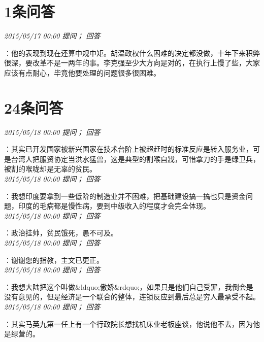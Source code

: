\documentclass[twocolumn]{ctexart}
\begin{document}
\section{1条问答}

\textit{\hfill\noindent\small 2015/05/17 00:00 提问； 回答}

：他的表现到现在还算中规中矩。胡温政权什么困难的决定都没做，十年下来积弊很深，要改革不是一两年的事。李克强至少大方向是对的，在执行上慢了些，大家应该有点耐心，毕竟他要处理的问题很多很困难。\\

\section{24条问答}

\textit{\hfill\noindent\small 2015/05/18 00:00 提问； 回答}

：其实已开发国家被新兴国家在技术台阶上被超赶时的标准反应是转入服务业，可是台湾人把服贸协定当洪水猛兽，这是典型的割喉自戕，可惜拿刀的手是绿卫兵，被割的喉咙却是无辜的贫民。\\

\textit{\hfill\noindent\small 2015/05/18 00:00 提问； 回答}

：我想印度要拿到一些低阶的制造业并不困难，把基础建设搞一搞也只是资金问题，印度的毛病都是慢性病，要到中级收入的程度才会完全体现。\\

\textit{\hfill\noindent\small 2015/05/18 00:00 提问； 回答}

：政治挂帅，贫民饿死，愚不可及。\\

\textit{\hfill\noindent\small 2015/05/18 00:00 提问； 回答}

：谢谢您的指教，主文已更正。\\

\textit{\hfill\noindent\small 2015/05/18 00:00 提问； 回答}

：我想大陆把这个叫做\&ldquo;傲娇\&rdquo;，如果只是他们自己受罪，我倒会是没有意见的，但是经济是一个联合的整体，连锁反应到最后总是穷人最承受不起。\\

\textit{\hfill\noindent\small 2015/05/18 00:00 提问； 回答}

：其实马英九第一任上有一个行政院长想找机床业老板座谈，他说他不去，因为他是绿营的。\\
\end{document}

